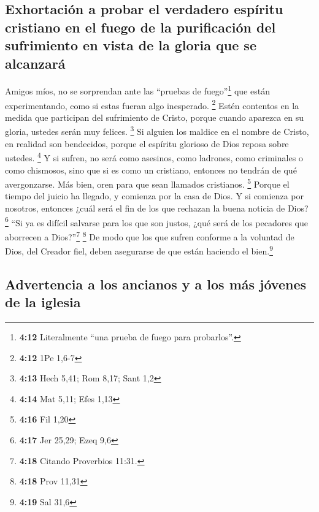 \hypertarget{exhortaciuxf3n-a-probar-el-verdadero-espuxedritu-cristiano-en-el-fuego-de-la-purificaciuxf3n-del-sufrimiento-en-vista-de-la-gloria-que-se-alcanzaruxe1}{%
\subsection{Exhortación a probar el verdadero espíritu cristiano en el
fuego de la purificación del sufrimiento en vista de la gloria que se
alcanzará}\label{exhortaciuxf3n-a-probar-el-verdadero-espuxedritu-cristiano-en-el-fuego-de-la-purificaciuxf3n-del-sufrimiento-en-vista-de-la-gloria-que-se-alcanzaruxe1}}

 Amigos míos, no se sorprendan ante las ``pruebas de
fuego''\footnote{\textbf{4:12} Literalmente ``una prueba de fuego para
  probarlos''.} que están experimentando, como si estas fueran algo
inesperado. \footnote{\textbf{4:12} 1Pe 1,6-7}  Estén
contentos en la medida que participan del sufrimiento de Cristo, porque
cuando aparezca en su gloria, ustedes serán muy felices. \footnote{\textbf{4:13}
  Hech 5,41; Rom 8,17; Sant 1,2}  Si alguien los maldice
en el nombre de Cristo, en realidad son bendecidos, porque el espíritu
glorioso de Dios reposa sobre ustedes. \footnote{\textbf{4:14} Mat 5,11;
  Efes 1,13}  Y si sufren, no será como asesinos, como
ladrones, como criminales o como chismosos,  sino que si
es como un cristiano, entonces no tendrán de qué avergonzarse. Más bien,
oren para que sean llamados cristianos. \footnote{\textbf{4:16} Fil 1,20}
 Porque el tiempo del juicio ha llegado, y comienza por
la casa de Dios. Y si comienza por nosotros, entonces ¿cuál será el fin
de los que rechazan la buena noticia de Dios? \footnote{\textbf{4:17}
  Jer 25,29; Ezeq 9,6}  ``Si ya es difícil salvarse para
los que son justos, ¿qué será de los pecadores que aborrecen a
Dios?''\footnote{\textbf{4:18} Citando Proverbios 11:31.} \footnote{\textbf{4:18}
  Prov 11,31}  De modo que los que sufren conforme a la
voluntad de Dios, del Creador fiel, deben asegurarse de que están
haciendo el bien.\footnote{\textbf{4:19} Sal 31,6}

\hypertarget{advertencia-a-los-ancianos-y-a-los-muxe1s-juxf3venes-de-la-iglesia}{%
\subsection{Advertencia a los ancianos y a los más jóvenes de la
iglesia}\label{advertencia-a-los-ancianos-y-a-los-muxe1s-juxf3venes-de-la-iglesia}}

